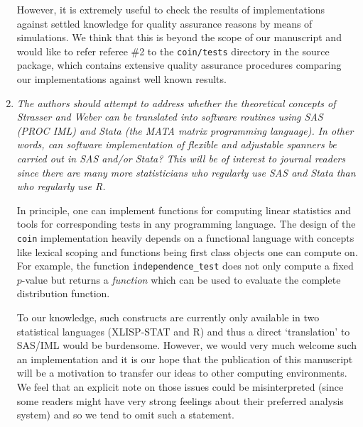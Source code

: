 \documentclass[11pt]{article}
\begin{document}
\begin{enumerate}
However, it is extremely useful to check the results of implementations
against settled knowledge for quality assurance reasons by means of
simulations. We
think that this is beyond the scope of our manuscript and would like to
refer referee \#2 to the \texttt{coin/tests} directory in the source
package, which contains extensive quality assurance procedures comparing our
implementations against well known results.

\item \textsl{The authors should attempt to address whether the theoretical concepts of
              Strasser and Weber can be translated into software routines using 
              SAS (PROC IML) and Stata (the MATA matrix programming language). In other 
              words, can software implementation of flexible and adjustable
              spanners be carried out in SAS and/or Stata? This will be of interest to
              journal readers since there are many more statisticians who regularly use 
              SAS and Stata than who regularly use R.}

In principle, one can implement functions for computing linear statistics
and tools for corresponding tests in any programming language. The design of
the \texttt{coin} implementation heavily depends on a functional language 
with concepts like lexical
scoping and functions being first class objects one can compute on. For
example, the function \texttt{independence\_test} does not only compute a
fixed $p$-value but returns a \textit{function} which can be used to
evaluate the complete distribution function.

To our knowledge, such constructs are currently only available in two
statistical languages (\textsf{XLISP-STAT} and \textsf{R}) and thus a direct
`translation' to \textsf{SAS/IML} would be burdensome. However, we would
very much welcome such an implementation and it is our hope that the
publication of this manuscript will be a motivation to transfer our ideas
to other computing environments. We feel that an explicit note on those
issues could be misinterpreted (since some readers might have very strong 
feelings about their preferred analysis system) and so we tend to omit 
such a statement.

\end{enumerate}
\end{document}
